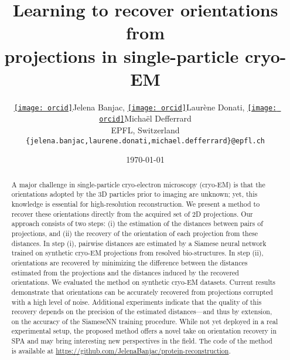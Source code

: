 \documentclass{article}
\author{
    \href{https://orcid.org/0000-0001-7373-4150}{\texttt{[image: orcid]}\hspace{1mm}}Jelena Banjac,
    \href{https://orcid.org/0000-0001-9834-7755}{\texttt{[image: orcid]}\hspace{1mm}}Laurène Donati,
    \href{https://orcid.org/0000-0002-6028-9024}{\texttt{[image: orcid]}\hspace{1mm}}Michaël Defferrard \\
    EPFL, Switzerland \\
    \texttt{\{jelena.banjac,laurene.donati,michael.defferrard\}@epfl.ch}
}
\date{\today}
\title{Learning to recover orientations from\\projections in single-particle cryo-EM}
\begin{document}
\maketitle

\begin{abstract}
    A major challenge in single-particle cryo-electron microscopy (cryo-EM) is that the orientations adopted by the 3D particles prior to imaging are unknown; yet, this knowledge is essential for high-resolution reconstruction.
    We present a method to recover these orientations directly from the acquired set of 2D projections.
    Our approach consists of two steps: (i) the estimation of the distances between pairs of projections, and (ii) the recovery of the orientation of each projection from these distances.
    In step (i), pairwise distances are estimated by a Siamese neural network trained on synthetic cryo-EM projections from resolved bio-structures.
    In step (ii), orientations are recovered by minimizing the difference between the distances estimated from the projections and the distances induced by the recovered orientations.
    We evaluated the method on synthetic cryo-EM datasets. Current results demonstrate that orientations can be accurately recovered from projections corrupted with a high level of noise. Additional experiments indicate that the quality of this recovery depends on the precision of the estimated distances---and thus by extension, on the accuracy of the SiameseNN training procedure.  
    While not yet deployed in a real experimental setup, the proposed method offers a novel take on orientation recovery in SPA and may bring interesting new perspectives in the field. 
    The code of the method is available at \url{https://github.com/JelenaBanjac/protein-reconstruction}.
\end{abstract}

%











\appendix

\end{document}
